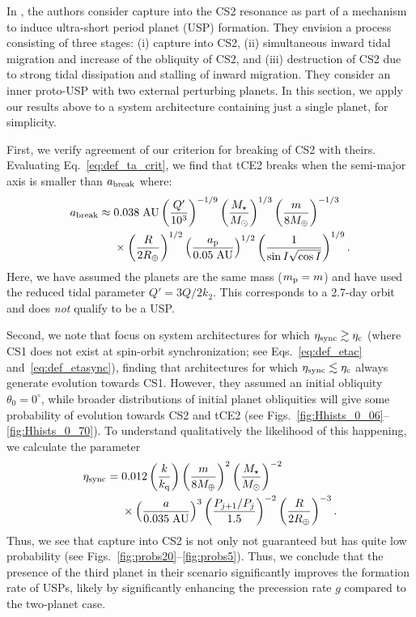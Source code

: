 \documentclass[
        fleqn,
        usenatbib,
    ]{mnras}
\newcommand*{\p}[1]{\left(#1\right)}
\begin{document}
In \citet{millholland2020formation}, the authors consider capture into the CS2
resonance as part of a mechanism to induce ultra-short period planet (USP)
formation. They envision a process consisting of three stages: (i) capture into
CS2, (ii) simultaneous inward tidal migration and increase of the obliquity of
CS2, and (iii) destruction of CS2 due to strong tidal dissipation and stalling
of inward migration. They consider an inner proto-USP with two external
perturbing planets. In this section, we apply our results above to a system
architecture containing just a single planet, for simplicity.

First, we verify agreement of our criterion for breaking of CS2 with theirs.
Evaluating Eq.~\eqref{eq:def_ta_crit}, we find that tCE2 breaks when the
semi-major axis is smaller than $a_{\rm break}$ where:
\begin{align}
    a_{\rm break} \approx{}& 0.038 \;\mathrm{AU}
        \p{\frac{Q'}{10^{3}}}^{-1/9}
        \p{\frac{M_\star}{M_{\odot}}}^{1/3}
        \p{\frac{m}{8M_{\oplus}}}^{-1/3}\nonumber\\
        &\times \p{\frac{R}{2R_{\oplus}}}^{1/2}
        \p{\frac{a_{\rm p}}{0.05\;\mathrm{AU}}}^{1/2}
        \p{\frac{1}{\sin I \sqrt{\cos I}}}^{1/9}.
\end{align}
Here, we have assumed the planets are the same mass ($m_{\rm p} = m$) and have
used the reduced tidal parameter $Q' = 3Q / 2k_2$. This corresponds to a 2.7-day
orbit and does \emph{not} qualify to be a USP\@.

Second, we note that \citet{millholland2020formation} focus on system
architectures for which $\eta_{\rm sync} \gtrsim \eta_{\rm c}$ (where CS1 does
not exist at spin-orbit synchronization; see Eqs.~\ref{eq:def_etac}
and~\ref{eq:def_etasync}), finding that architectures for which $\eta_{\rm sync}
\lesssim \eta_{\rm c}$ always generate evolution towards CS1. However, they
assumed an initial obliquity $\theta_{0} = 0^\circ$, while broader distributions
of initial planet obliquities will give some probability of evolution towards
CS2 and tCE2 (see Figs.~\ref{fig:Hhists_0_06}--\ref{fig:Hhists_0_70}). To
understand qualitatively the likelihood of this happening, we calculate the
parameter
\begin{align}
    \eta_{\rm sync} ={}& 0.012 \p{\frac{k}{k_{\rm q}}}
            \p{\frac{m}{8 M_{\oplus}}}^2
            \p{\frac{M_\star}{M_{\odot}}}^{-2}\nonumber\\
        &\times \p{\frac{a}{0.035 \;\mathrm{AU}}}^{3}
            \p{\frac{P_{j + 1} / P_j}{1.5}}^{-2}
            \p{\frac{R}{2R_{\oplus}}}^{-3}.
\end{align}
Thus, we see that capture into CS2 is not only not guaranteed but has quite low
probability (see Figs.~\ref{fig:probs20}--\ref{fig:probs5}). Thus, we conclude
that the presence of the third planet in their scenario significantly improves
the formation rate of USPs, likely by significantly enhancing the precession
rate $g$ compared to the two-planet case.
\end{document}

